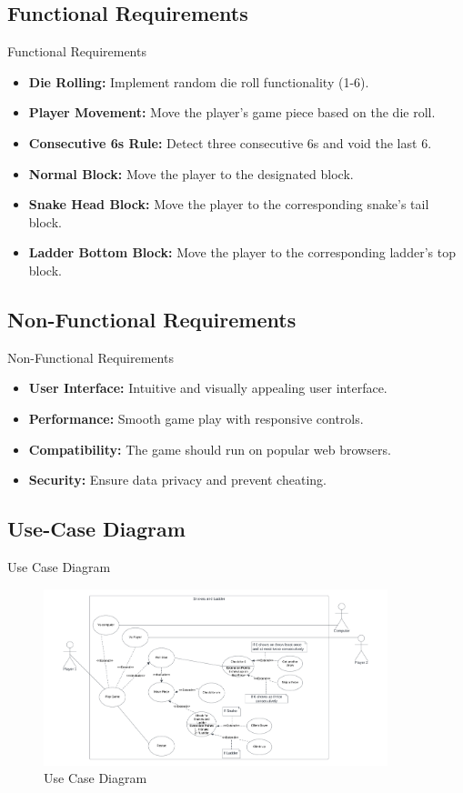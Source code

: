 \documentclass{beamer}
\begin{document}
\subsection{Functional Requirements}
\begin{frame}{Functional Requirements}
      \begin{itemize}
        \item \textbf{Die Rolling:} Implement random die roll functionality (1-6).
        \item \textbf{Player Movement:} Move the player's game piece based on the die roll.
        \item \textbf{Consecutive 6s Rule:} Detect three consecutive 6s and void the last 6.
        \item \textbf{Normal Block:} Move the player to the designated block.
        \item \textbf{Snake Head Block:} Move the player to the corresponding snake's tail block.
        \item \textbf{Ladder Bottom Block:} Move the player to the corresponding ladder's top block.
    \end{itemize}
\end{frame}
\subsection{Non-Functional Requirements}
\begin{frame}{Non-Functional Requirements}
        \begin{itemize}
        \item \textbf{User Interface:} Intuitive and visually appealing user interface.
        \item \textbf{Performance:} Smooth game play with responsive controls.
        \item \textbf{Compatibility:} The game should run on popular web browsers.
        \item \textbf{Security:} Ensure data privacy and prevent cheating.
    \end{itemize}
\end{frame}
\subsection{Use-Case Diagram}
\begin{frame}{Use Case Diagram}
    \begin{figure}
        \centering
        \includegraphics[width = 10cm]{images/Use Case.png}
        \caption{Use Case Diagram}
    \end{figure}
\end{frame}
\end{document}
